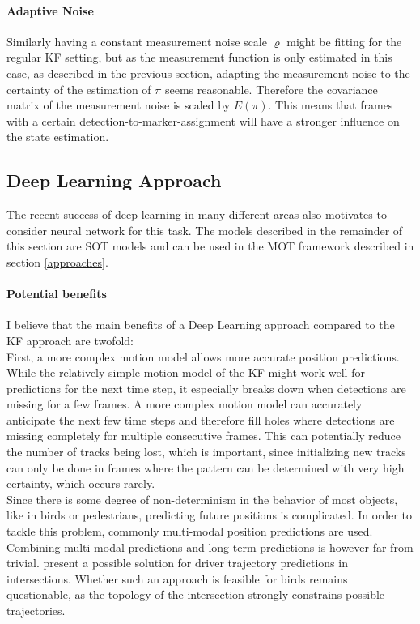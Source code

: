 \documentclass[12pt,a4paper]{article}
\begin{document}
\paragraph{Adaptive Noise} Similarly having a constant measurement noise scale $\varrho$
might be fitting for the regular KF setting, but as the measurement function is only estimated in this case, as described in the previous section, adapting the measurement noise to the certainty of the estimation of $\pi$ seems reasonable. Therefore the covariance matrix of the measurement noise is scaled by $E(\pi)$. This means that frames with a certain detection-to-marker-assignment will have a stronger influence on the state estimation.


\subsection{Deep Learning Approach}
\label{dl_approach}

The recent success of deep learning in many different areas also motivates to consider neural network for this task. The models described in the remainder of this section are SOT models and can be used in the MOT framework described in section \ref{approaches}.

\paragraph{Potential benefits}
I believe that the main benefits of a Deep Learning approach  compared to the KF approach are twofold: \\
First, a more complex motion model allows more accurate position predictions. While the relatively simple motion model of the KF might work well for predictions for the next time step, it especially breaks down when detections are missing for a few frames. A more complex motion model can accurately anticipate the next few time steps and therefore fill holes where detections are missing completely for multiple consecutive frames. This can potentially reduce the number of tracks being lost, which is important, since initializing new tracks can only be done in frames where the pattern can be determined with very high certainty, which occurs rarely.\\
Since there is some degree of non-determinism in the behavior of most objects, like in birds or pedestrians, predicting future positions is complicated. In order to tackle this problem, commonly multi-modal position predictions are used. Combining multi-modal predictions and long-term predictions is however far from trivial. \cite{multi_modal} present a possible solution for driver trajectory predictions in intersections. Whether such an approach is feasible for birds remains questionable, as the topology of the intersection strongly constrains possible trajectories.
\end{document}
